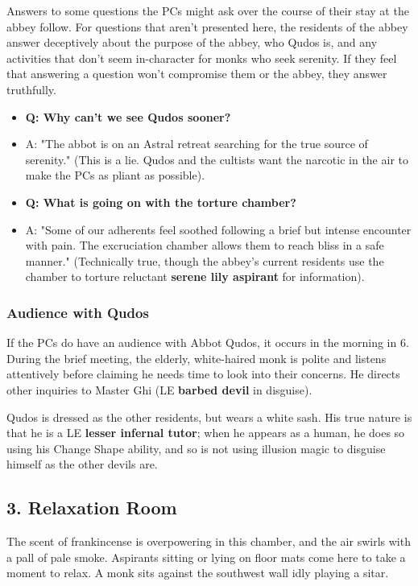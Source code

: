 \documentclass[10pt,a4paper,twoside,bg=print,twocolumn,openany,nodeprecatedcode]{dndbook}
\begin{document}
Answers to some questions the PCs might ask over the course of their stay at the abbey follow. For questions that aren't presented here, the residents of the abbey answer deceptively about the purpose of the abbey, who Qudos is, and any activities that don't seem in-character for monks who seek serenity. If they feel that answering a question won't compromise them or the abbey, they answer truthfully.


\begin{itemize}
\item \textbf{Q: Why can't we see Qudos sooner?}
\item A: "The abbot is on an Astral retreat searching for the true source of serenity." (This is a lie. Qudos and the cultists want the narcotic in the air to make the PCs as pliant as possible).
\item \textbf{Q: What is going on with the torture chamber?}
\item A: "Some of our adherents feel soothed following a brief but intense encounter with pain. The excruciation chamber allows them to reach bliss in a safe manner." (Technically true, though the abbey's current residents use the chamber to torture reluctant \textbf{serene lily aspirant} for information).
\end{itemize}

\subsubsection{Audience with Qudos}
If the PCs do have an audience with Abbot Qudos, it occurs in the morning in 6. During the brief meeting, the elderly, white-haired monk is polite and listens attentively before claiming he needs time to look into their concerns. He directs other inquiries to Master Ghi (LE \textbf{barbed devil} in disguise).

Qudos is dressed as the other residents, but wears a white sash. His true nature is that he is a LE \textbf{lesser infernal tutor}; when he appears as a human, he does so using his Change Shape ability, and so is not using illusion magic to disguise himself as the other devils are.

\subsection{3. Relaxation Room}
\begin{DndReadAloud}{}
The scent of frankincense is overpowering in this chamber, and the air swirls with a pall of pale smoke. Aspirants sitting or lying on floor mats come here to take a moment to relax. A monk sits against the southwest wall idly playing a sitar.

\end{DndReadAloud}
\end{document}
